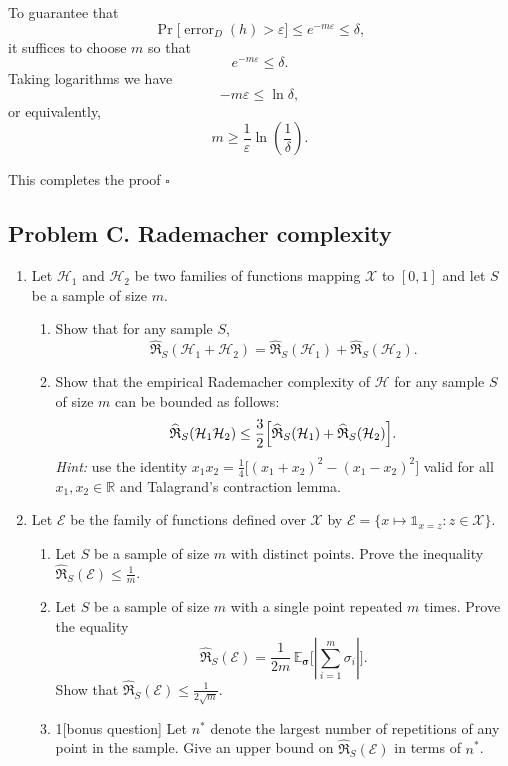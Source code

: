 \documentclass[letterpaper, 11pt]{article}
\newcommand{\1}{\mathds{1}}	%
\theoremstyle{definition}
\begin{document}
To guarantee that
\[
\Pr\big[\operatorname{error}_D(h) > \varepsilon\big] \le e^{-m\varepsilon} \le \delta,
\]
it suffices to choose \(m\) so that
\[
e^{-m\varepsilon} \le \delta.
\]
Taking logarithms we have
\[
-m\varepsilon \le \ln \delta,
\]
or equivalently,
\[
m \ge \frac{1}{\varepsilon}\ln\!\left(\frac{1}{\delta}\right).
\]

This completes the proof
\hfill \(\square\)
\subsection*{Problem C. Rademacher complexity}
\begin{enumerate}[leftmargin=1.2em,label=\arabic*.]
\item Let $\mathcal{H}_1$ and $\mathcal{H}_2$ be two families of functions mapping $\mathcal{X}$ to $[0,1]$ and let $S$ be a sample of size $m$.
  \begin{enumerate}[label=(\alph*)]
  \item Show that for any sample $S$,
  \[
  \widehat{\mathfrak{R}}_{S}(\mathcal{H}_1+\mathcal{H}_2)
  =\widehat{\mathfrak{R}}_{S}(\mathcal{H}_1)+\widehat{\mathfrak{R}}_{S}(\mathcal{H}_2).
  \]
  \item Show that the empirical Rademacher complexity of $\mathcal{H}$ for any sample $S$ of size $m$ can be bounded as follows:
  \[
  \widehat{\mathfrak{R}}_{S}(\mathcal{H}_1\mathcal{H}_2)
  \le \frac{3}{2}\Bigl[\widehat{\mathfrak{R}}_{S}(\mathcal{H}_1)+\widehat{\mathfrak{R}}_{S}(\mathcal{H}_2)\Bigr].
  \]
  \textit{Hint:} use the identity $x_1 x_2=\tfrac14\bigl[(x_1+x_2)^2-(x_1-x_2)^2\bigr]$ valid for all $x_1,x_2\in\mathbb{R}$ and Talagrand's contraction lemma.
  \end{enumerate}

\item Let $\mathcal{E}$ be the family of functions defined over $\mathcal{X}$ by $\mathcal{E}=\{x\mapsto \mathbb{1}_{x=z}\colon z\in\mathcal{X}\}$.
  \begin{enumerate}[label=(\alph*)]
  \item Let $S$ be a sample of size $m$ with distinct points. Prove the inequality $\widehat{\mathfrak{R}}_{S}(\mathcal{E})\le \tfrac{1}{m}$.
  \item Let $S$ be a sample of size $m$ with a single point repeated $m$ times. Prove the equality
  \[
  \widehat{\mathfrak{R}}_{S}(\mathcal{E})=\frac{1}{2m}\,\mathbb{E}_{\boldsymbol{\sigma}}\bigl[\left| \sum_{i=1}^{m}\sigma_i \right|\bigr].
  \]
  Show that $\widehat{\mathfrak{R}}_{S}(\mathcal{E})\le \tfrac{1}{2\sqrt{m}}$.
  \item  1[bonus question] Let $n^\ast$ denote the largest number of repetitions of any point in the sample. Give an upper bound on $\widehat{\mathfrak{R}}_{S}(\mathcal{E})$ in terms of $n^\ast$.
  \end{enumerate}
\end{enumerate}
\end{document}
